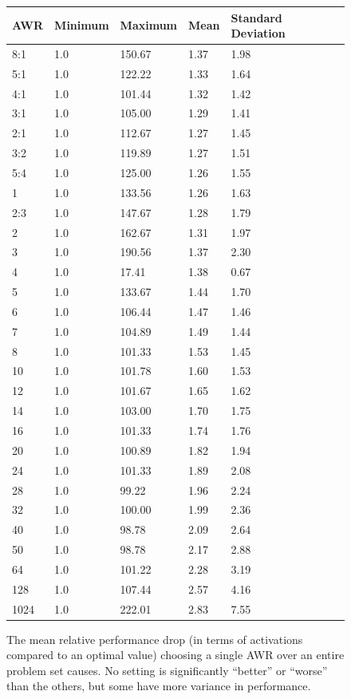 \documentclass{llncs}
\begin{document}
\begin{figure}
	\centering
	\begin{tabular}{l l l l l}
AWR & Minimum & Maximum & Mean & Standard Deviation\\
\hline
8:1 & 1.0 & 150.67 & 1.37 & 1.98\\
5:1 & 1.0 & 122.22 & 1.33 & 1.64\\
4:1 & 1.0 & 101.44 & 1.32 & 1.42\\
3:1 & 1.0 & 105.00 & 1.29 & 1.41\\
2:1 & 1.0 & 112.67 & 1.27 & 1.45\\
3:2 & 1.0 & 119.89 & 1.27 & 1.51\\
5:4 & 1.0 & 125.00 & 1.26 & 1.55\\
1 & 1.0 & 133.56 & 1.26 & 1.63\\
2:3 & 1.0 & 147.67 & 1.28 & 1.79\\
2 & 1.0 & 162.67 & 1.31 & 1.97\\
3 & 1.0 & 190.56 & 1.37 & 2.30\\
4 & 1.0 & 17.41 & 1.38 & 0.67\\
5 & 1.0 & 133.67 & 1.44 & 1.70\\
6 & 1.0 & 106.44 & 1.47 & 1.46\\
7 & 1.0 & 104.89 & 1.49 & 1.44\\
8 & 1.0 & 101.33 & 1.53 & 1.45\\
10 & 1.0 & 101.78 & 1.60 & 1.53\\
12 & 1.0 & 101.67 & 1.65 & 1.62\\
14 & 1.0 & 103.00 & 1.70 & 1.75\\
16 & 1.0 & 101.33 & 1.74 & 1.76\\
20 & 1.0 & 100.89 & 1.82 & 1.94\\
24 & 1.0 & 101.33 & 1.89 & 2.08\\
28 & 1.0 & 99.22 & 1.96 & 2.24\\
32 & 1.0 & 100.00 & 1.99 & 2.36\\
40 & 1.0 & 98.78 & 2.09 & 2.64\\
50 & 1.0 & 98.78 & 2.17 & 2.88\\
64 & 1.0 & 101.22 & 2.28 & 3.19\\
128 & 1.0 & 107.44 & 2.57 & 4.16\\
1024 & 1.0 & 222.01 & 2.83 & 7.55
	\end{tabular}
	\caption{The mean relative performance drop (in terms of activations compared to an optimal value) choosing a single AWR over an entire problem set causes. No setting is significantly ``better'' or ``worse'' than the others, but some have more variance in performance.}
	\label{fig:no-best-awr}
\end{figure}
\end{document}
